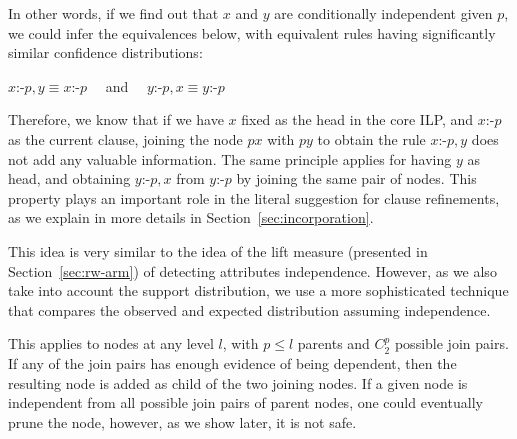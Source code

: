 In other words, if we find out that $x$ and $y$ are conditionally independent given $p$, we could infer the
equivalences below, with equivalent rules having significantly similar confidence distributions:

\begin{center}
  $x$:-$p,y \equiv x$:-$p \quad$ and  $\quad y$:-$p,x \equiv y$:-$p$
\end{center}

Therefore, we know that if we have $x$ fixed as the head in the core ILP, and $x$:-$p$ as the current
clause, joining the node $px$ with $py$ to obtain the rule $x$:-$p,y$ does not add any valuable information. The same
principle applies for having $y$ as head, and obtaining $y$:-$p,x$ from $y$:-$p$ by joining the same pair of nodes. This
property plays an important role in the literal suggestion for clause refinements, as we explain in
more details in Section~\ref{sec:incorporation}.

This idea is very similar to the idea of the lift measure (presented in Section~\ref{sec:rw-arm}) of detecting
attributes independence. However, as we also take into account the support distribution, we use a more sophisticated
technique that compares the observed and expected distribution assuming independence.

This applies to nodes at any level $l$, with $p \leq l$ parents and $C_{2}^{p}$ possible join pairs. If any of the
join pairs has enough evidence of being dependent, then the resulting node is added as child of the two joining nodes.
If a given node is independent from all possible join pairs of parent nodes, one could eventually prune the node,
however, as we show later, it is not safe.

